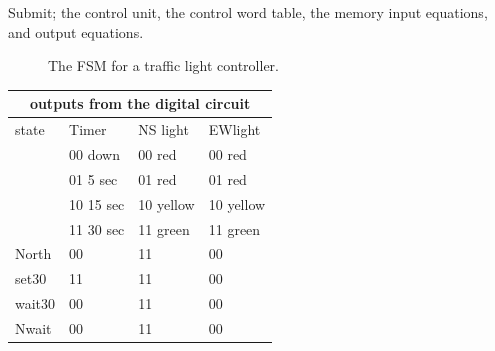 \begin{enumerate}
Submit;
the control unit,
the control word table,
the memory input equations, and
output equations.


\begin{solution}{

\begin{figure}[ht]
\caption{The FSM for a traffic light controller.}
\end{figure}

\begin{tabular}{|l|||l|l|l|} \hline
\multicolumn{4}{|c|}{outputs from the digital circuit}    \\ \hline \hline
state & Timer     & NS light  & EWlight     \\ \hline
      & 00 down   & 00 red    & 00 red      \\ \hline
      & 01 5 sec  & 01 red    & 01 red      \\ \hline
      & 10 15 sec & 10 yellow & 10 yellow   \\ \hline
      & 11 30 sec & 11 green  & 11 green    \\ \hline \hline
North	& 00 	  & 11	      & 00  \\ \hline
set30 & 11 	  & 11	      & 00  \\ \hline
wait30& 00 	  & 11	      & 00  \\ \hline
Nwait	& 00 	  & 11	      & 00  \\ \hline


\end{tabular}}
\end{solution}
\end{enumerate}
